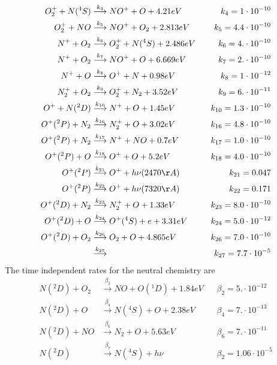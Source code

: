 \begin{align}
 O_2^+ + N(^4S) & \stackrel{k_4}{\longrightarrow}  NO^+ + O + 4.21 eV  & \;\;\; k_4 = 1\cdot 10^{-10} \\
 O_2^+ + NO     & \stackrel{k_5}{\longrightarrow}  NO^+ + O_2 + 2.813 eV  & \;\;\; k_5 = 4.4\cdot 10^{-10} \\
 N^+ + O_2      & \stackrel{k_6}{\longrightarrow}  O_2^+ + N(^4S) + 2.486 eV  & \;\;\; k_6 = 4.\cdot 10^{-10} \\
 N^+ + O_2      & \stackrel{k_7}{\longrightarrow}  NO^+ + O + 6.669 eV  & \;\;\; k_7 = 2.\cdot 10^{-10} \\
 N^+ + O        & \stackrel{k_8}{\longrightarrow}  O^+ + N + 0.98 eV  & \;\;\; k_8 = 1\cdot 10^{-12} \\
 N_2^+ + O_2 & \stackrel{k_9}{\longrightarrow}  O_2^+ + N_2 + 3.52 eV  & \;\;\; k_9 = 6.\cdot 10^{-11} \\
 O^+ + N(^2D) & \stackrel{k_{10}}{\longrightarrow}  N^+ + O + 1.45 eV  & \;\;\; k_{10} = 1.3\cdot 10^{-10} \\
 O^+(^2P) + N_2 & \stackrel{k_{16}}{\longrightarrow}  N_2^+ + O + 3.02 eV  & \;\;\; k_{16} = 4.8\cdot 10^{-10} \\
 O^+(^2P) + N_2 & \stackrel{k_{17}}{\longrightarrow}  N^+ + NO + 0.7 eV  & \;\;\; k_{17} = 1.0\cdot 10^{-10} \\
 O^+(^2P) + O & \stackrel{k_{18}}{\longrightarrow}  O^+ + O + 5.2 eV  &  \;\;\;k_{18} = 4.0\cdot 10^{-10} \\
 O^+(^2P)  & \stackrel{k_{21}}{\longrightarrow}  O^+ + h\nu(2470 {\AA}) & \;\;\; k_{21} = 0.047 \\
 O^+(^2P)  & \stackrel{k_{22}}{\longrightarrow}  O^+ + h\nu(7320 {\AA}) & \;\;\; k_{22} = 0.171 \\
 O^+(^2D) + N_2 & \stackrel{k_{23}}{\longrightarrow}  N_2^+ + O + 1.33 eV  & \;\;\; k_{23} = 8.0\cdot 10^{-10} \\
 O^+(^2D) + O & \stackrel{k_{24}}{\longrightarrow}  O^+(^4S) + e + 3.31 eV  & \;\;\; k_{24} = 5.0\cdot 10^{-12} \\
 O^+(^2D) + O_2 & \stackrel{k_{26}}{\longrightarrow}  O_2 + O + 4.865 eV  & \;\;\; k_{26} = 7.0\cdot 10^{-10} \\
  & \stackrel{k_{27}}{\longrightarrow}     & k_{27} = 7.7\cdot 10^{-5}
\end{align}
%
The time independent rates for the neutral chemistry are
%
\begin{align}
 N(^2D) + O_2 & \stackrel{\beta_2}{\longrightarrow}  NO + O(^1D) + 1.84 eV  & \;\;\; \beta_2 = 5.\cdot 10^{-12} \\
 N(^2D) + O   & \stackrel{\beta_4}{\longrightarrow}  N(^4S) + O + 2.38 eV   & \;\;\; \beta_4 = 7.\cdot 10^{-13} \\
 N(^2D) + NO  & \stackrel{\beta_6}{\longrightarrow}  N_2 + O + 5.63 eV      & \;\;\; \beta_6 = 7.\cdot 10^{-11} \\
 N(^2D)       & \stackrel{\beta_7}{\longrightarrow}  N(^4S) + h \nu  & \;\;\; \beta_2 = 1.06\cdot 10^{-5} \\
\end{align}
